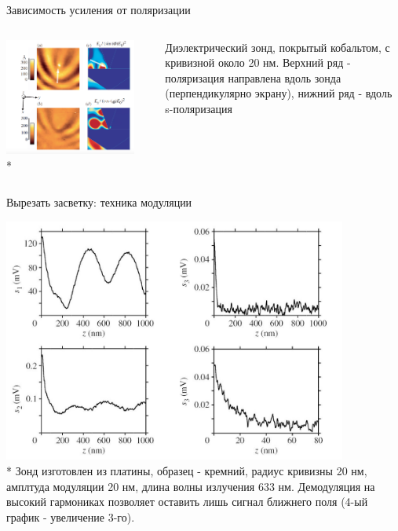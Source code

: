 \documentclass[9pt, compress, xcolor=table]{beamer}
\begin{document}
\begin{frame}{Зависимость усиления от поляризации}
\begin{columns}[c]
\column{8.5cm}
\begin{center}
\includegraphics[width=0.9\textwidth]{nfm33}
\\* 
\end{center}

\column{4cm}

Диэлектрический зонд, покрытый кобальтом, с кривизной около 20 нм. Верхний ряд - поляризация направлена вдоль зонда (перпендикулярно экрану), нижний ряд - вдоль s-поляризация 

\end{columns}

\end{frame}

\begin{frame}{Вырезать засветку: техника модуляции}

\begin{center}
\includegraphics[width=0.85\textwidth]{nfm7}
\\* Зонд изготовлен из платины, образец - кремний, радиус кривизны 20 нм, амплтуда модуляции 20 нм, длина волны излучения 633 нм. Демодуляция на высокий гармониках позволяет оставить лишь сигнал ближнего поля (4-ый график - увеличение 3-го). 
\end{center}

\end{frame}
\end{document}
